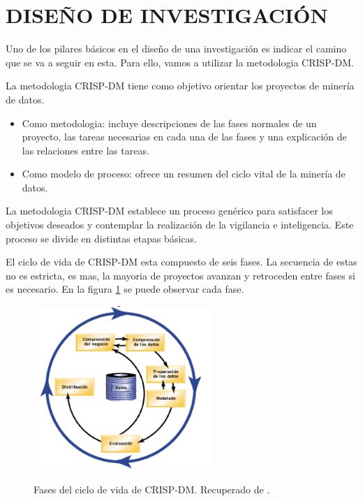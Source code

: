 \section{DISEÑO DE INVESTIGACIÓN}

Uno de los pilares básicos en el diseño de una investigación es indicar el camino que se va a seguir en esta. Para ello, vamos a utilizar la metodologia CRISP-DM. 

La metodologia CRISP-DM tiene como objetivo orientar los proyectos de minería de datos. 
\begin{itemize}
	\item Como metodologia: incluye descripciones de las fases normales de un proyecto, las tareas necesarias en cada una de las fases y una explicación de las relaciones entre las tareas.
	\item Como modelo de proceso: ofrece un resumen del ciclo vital de la minería de datos.
\end{itemize}

La metodologia CRISP-DM establece un proceso genérico para satisfacer los objetivos deseados y contemplar la realización de la vigilancia e inteligencia. Este proceso se divide en distintas etapas básicas. 

El ciclo de vida de CRISP-DM esta compuesto de seis fases. La secuencia de estas no es estricta, es mas, la mayoria de proyectos avanzan y retroceden entre fases si es necesario. En la figura \ref{fig:CicloCrispDM} se puede observar cada fase.

\begin{figure}[h]
\centering
\caption{Fases del ciclo de vida de CRISP-DM. Recuperado de \protect{}.}
 \includegraphics[width=0.6\textwidth]{recursos/CRISPCicloIBM}
\label{fig:CicloCrispDM}
\end{figure}
\FloatBarrier

